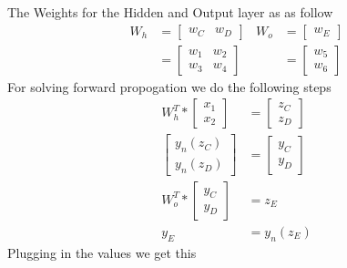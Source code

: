 \documentclass[12pt,english]{article}
\begin{document}
The Weights for the Hidden and Output layer as as follow
\begin{align*} 
W_h &= \begin{bmatrix} w_C & w_D \end{bmatrix} &
W_o &= \begin{bmatrix} w_E  \end{bmatrix} \\
&= \begin{bmatrix} w_1 & w_2 \\ w_3 & w_4 \end{bmatrix} &
&= \begin{bmatrix} w_5 \\ w_6 \end{bmatrix}
\end{align*}
For  solving forward propogation we do the following steps
\begin{align}
W^T_h * \begin{bmatrix} x_1 \\ x_2 \end{bmatrix}  &= \begin{bmatrix} z_C \\ z_D \end{bmatrix} \\
\begin{bmatrix} y_n(z_C) \\ y_n(z_D) \end{bmatrix} &= \begin{bmatrix} y_C \\ y_D \end{bmatrix} \\
W^T_o * \begin{bmatrix} y_C \\ y_D \end{bmatrix} &=z_E\\
y_E &= y_n(z_E)
\end{align}
Plugging in the values we get this
\end{document}
